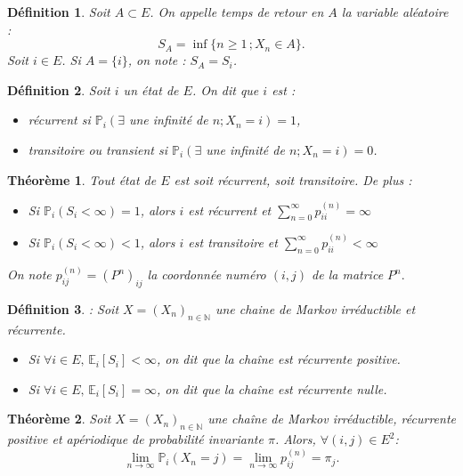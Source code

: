 \documentclass[12pt,a4paper]{report}
\newtheorem{thm}{Théorème}[section]
\newtheorem{definition}{Définition}[section]
\theoremstyle{remark}
\begin{document}
\begin{definition}\label{def2}
Soit $A\subset E$. On appelle temps de retour en $A$ la variable aléatoire : $$S_A = \inf\{{n\geqslant 1} \, ; X_n \in A\}.$$
Soit $i \in E$. Si $A = \{i\}$, on note : $S_A = S_i$.
\end{definition}
\begin{definition}\label{defaaa}
Soit $i$ un état de $E$. On dit que $i$ est :
\begin{itemize}
\item récurrent si  $\mathbb{P}_{i}\left(\exists\right.$ une infinité de $\left.n ; X_{n}=i\right)=1$,
\item transitoire ou transient si  $\mathbb{P}_{i}\left(\exists\right.$ une
infinité de $\left.n ; X_{n}=i\right)=0$.
\end{itemize}
\end{definition}
\begin{thm}\label{th5}
Tout état de $E$ est soit récurrent, soit transitoire. De plus :
\begin{itemize}
    \item Si $\mathbb{P}_i(S_i<\infty)=1$, alors $i$ est récurrent et $\sum\limits_{n=0}^{\infty} p_{ii}^{(n)}=\infty$
     \item Si $\mathbb{P}_i(S_i<\infty)<1$, alors $i$ est transitoire et $\sum\limits_{n=0}^{\infty} p_{ii}^{(n)}<\infty$
\end{itemize}
On note $p_{i j}^{(n)}=\left(P^{n}\right)_{i j}$ la coordonnée numéro $(i, j)$ de la matrice $P^{n}.$
\end{thm}
\begin{definition}\label{def21}: Soit $X=\left(X_{n}\right)_{n \in \mathbb{N}}$ une chaine de Markov irréductible et récurrente.
\begin{itemize}
    \item Si $\forall i \in E, \, \mathbb{E}_{i}\left[S_{i}\right]<\infty$, on dit que la chaîne est récurrente positive.
    \item Si $\forall i \in E, \, \mathbb{E}_{i}\left[S_{i}\right]=\infty$, on dit que la chaîne est récurrente nulle.
\end{itemize}
\end{definition}
\begin{thm}\label{th3}
Soit $X=(X_n)_{n \in \mathbb{N}}$ une chaîne de Markov irréductible, récurrente positive et apériodique de probabilité invariante $\pi$. Alors, $\forall (i,j) \in E^2$:
$$\lim\limits_{n \rightarrow \infty} \mathbb{P}_i(X_n = j) = \lim\limits_{n \rightarrow \infty} p^{(n)}_{ij} = \pi_j.$$
\end{thm}
\end{document}
